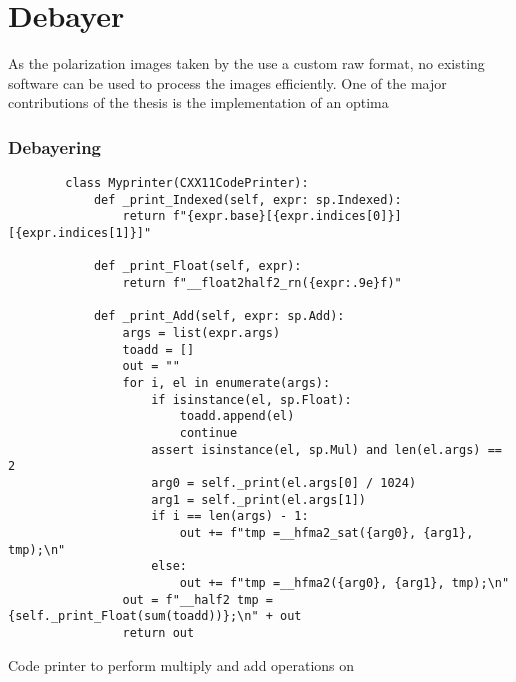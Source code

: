 
\chapter{Debayer}
As the polarization images taken by the \cams use a custom raw format, no existing software can be used to process the images efficiently.
One of the major contributions of the thesis is the implementation of an optima


\subsection{Debayering}
\cite{getreuerMalvarHeCutlerLinearImage2011}

\begin{listing}[H]
    \begin{verbatim}
        class Myprinter(CXX11CodePrinter):
            def _print_Indexed(self, expr: sp.Indexed):
                return f"{expr.base}[{expr.indices[0]}][{expr.indices[1]}]"

            def _print_Float(self, expr):
                return f"__float2half2_rn({expr:.9e}f)"

            def _print_Add(self, expr: sp.Add):
                args = list(expr.args)
                toadd = []
                out = ""
                for i, el in enumerate(args):
                    if isinstance(el, sp.Float):
                        toadd.append(el)
                        continue
                    assert isinstance(el, sp.Mul) and len(el.args) == 2
                    arg0 = self._print(el.args[0] / 1024)
                    arg1 = self._print(el.args[1])
                    if i == len(args) - 1:
                        out += f"tmp =__hfma2_sat({arg0}, {arg1}, tmp);\n"
                    else:
                        out += f"tmp =__hfma2({arg0}, {arg1}, tmp);\n"
                out = f"__half2 tmp = {self._print_Float(sum(toadd))};\n" + out
                return out
        \end{verbatim}
    \caption{Code printer to perform multiply and add operations on \halftwo}
\end{listing}

